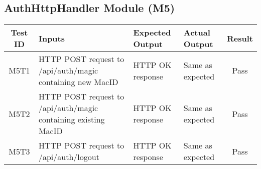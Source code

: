 \documentclass[fullpage]{article}
\begin{document}
\subsection{AuthHttpHandler Module (M5)}
\begin{table}[H]
\flushleft
\begin{tabular}{|c|p{4.5cm}|p{3.6cm}|p{3.6cm}|c|}
\hline
 \rowcolor{lightgray}
\textbf{Test ID} &\textbf{Inputs} &\textbf{Expected Output} &\textbf{Actual Output} &\textbf{Result}\\
\hline
M5T1 & HTTP POST request to /api/auth/magic containing new MacID & HTTP OK response & Same as expected & Pass \\
\hline
M5T2 & HTTP POST request to /api/auth/magic containing existing MacID & HTTP OK response & Same as expected & Pass \\
\hline
M5T3 & HTTP POST request to /api/auth/logout & HTTP OK response & Same as expected & Pass \\
\hline
\end{tabular}
\end{table}
\end{document}
